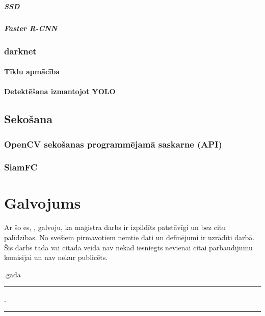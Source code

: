 \documentclass[12pt,paper=a4]{report}
\begin{document}
\paragraph{SSD}
\paragraph{Faster R-CNN}
\subsection{darknet}
\subsubsection{Tīklu apmācība}
\subsubsection{Detektēšana izmantojot YOLO}
\section{Sekošana}
\subsection{OpenCV sekošanas programmējamā saskarne (API)}
\subsection{SiamFC}




\chapter*{Galvojums}
 Ar šo es, , galvoju, ka maģistra darbs ir izpildīts patstāvīgi un bez citu palīdzības. No svešiem pirmavotiem ņemtie dati un definējumi ir uzrādīti darbā. Šis darbs tādā vai citādā veidā nav nekad iesniegts nevienai citai pārbaudījumu komisijai un nav nekur publicēts.

\vspace{1in}
.gada \rule{1cm}{0.2pt}.\rule{3cm}{0.2pt}
\label{LastPage}
\end{document}
